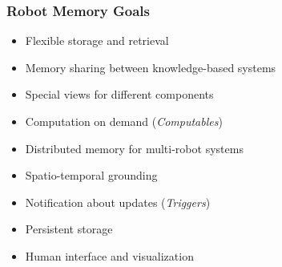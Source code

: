 \begin{frame}
  \frametitle{Robot Memory Goals}
  \begin{itemize}
  \item Flexible storage and retrieval %
  \item Memory sharing between knowledge-based systems
  \item Special views for different components
  \item Computation on demand (\emph{Computables})
  \item Distributed memory for multi-robot systems
  \item Spatio-temporal grounding
  \item Notification about updates (\emph{Triggers})
  \item Persistent storage
  \item Human interface and visualization
  \end{itemize}
\end{frame}


